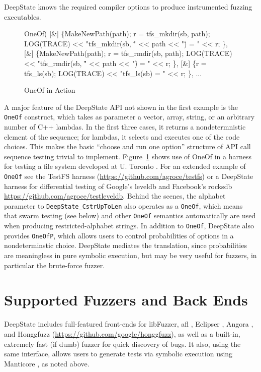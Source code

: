 \documentclass[sigconf]{acmart}
\begin{document}
\noindent DeepState knows the required compiler options to produce instrumented fuzzing executables.


\begin{figure}
{\scriptsize
\begin{code}
    OneOf(
	  [\&] \{MakeNewPath(path);
            r = tfs\_mkdir(sb, path);
            LOG(TRACE) << "tfs\_mkdir(sb, \"" << path << "\") = " << r;
	  \},
	  [\&] \{MakeNewPath(path);
            r = tfs\_rmdir(sb, path);
            LOG(TRACE) << "tfs\_rmdir(sb, \"" << path << "\") = " << r;
	  \},
	  [\&] \{r = tfs\_ls(sb);
            LOG(TRACE) << "tfs\_ls(sb) = " << r;
	  \},
   ...
\end{code}
}
  \caption{OneOf in Action}
  \label{fig:oneof}
  \end{figure}


  A major feature of the DeepState API not shown in the first example is the {\tt OneOf} construct, which takes as parameter a vector, array, string, or an arbitrary number of C++ lambdas.  In the first three cases, it returns a nondetermnistic element of the sequence; for lambdas, it selects and executes one of the code choices.  This makes the basic ``choose and run one option'' structure of API call sequence testing trivial to implement.  Figure~\ref{fig:oneof} shows use of OneOf in a harness for testing a file system developed at U. Toronto \cite{testfs}.  For an extended example of {\tt OneOf} see the TestFS harness (\url{https://github.com/agroce/testfs}) or a DeepState harness for differential testing of Google's leveldb and Facebook's rocksdb \url{https://github.com/agroce/testleveldb}.  Behind the scenes, the alphabet parameter to {\tt DeepState\_CstrUpToLen} also operates as a {\tt OneOf}, which means that swarm testing (see below) and other {\tt OneOf} semantics automatically are used when producing restricted-alphabet strings.  In addition to {\tt OneOf}, DeepState also provides {\tt OneOfP}, which allows users to control probabilities of options in a nondeterminstic choice.  DeepState mediates the translation, since probabilities are meaningless in pure symbolic execution, but may be very useful for fuzzers, in particular the brute-force fuzzer.


  
\section{Supported Fuzzers and Back Ends}

DeepState includes full-featured front-ends for libFuzzer, afl \cite{aflfuzz}, Eclipser \cite{choi:icse:2019}, Angora \cite{chen2018angora}, and Honggfuzz (\url{https://github.com/google/honggfuzz}), as well as a built-in, extremely fast (if dumb) fuzzer for quick discovery of bugs.  It also, using the same interface, allows users to generate tests via symbolic execution using Manticore \cite{mossberg2019manticore}, as noted above.
\end{document}
